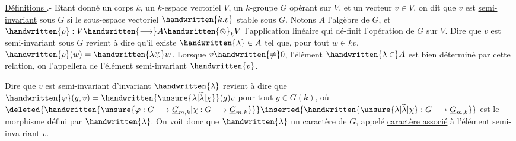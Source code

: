 \uline{Définitions }.- Etant donné un corps $k$, un $k$-espace vectoriel $V$, un $k$-groupe $G$ opérant sur $V$, et un vecteur $v\in V$, on dit que $v$ est \uline{semi-invariant} sous $G$ si le sous-espace vectoriel $\handwritten{k.v}$  stable sous $G$.
Notons $A$ l'algèbre de $G$, et $\handwritten{\rho}:V\handwritten{\longrightarrow}A\handwritten{\otimes}_k V$ l'application linéaire qui dé-\linebreak finit l'opération de $G$ sur $V$. Dire que $v$ est semi-invariant sous $G$ revient à dire  qu'il existe $\handwritten{\lambda}\in A$ tel que, pour tout $w\in kv$, $\handwritten{\rho}(w)=\handwritten{\lambda\otimes}w$. Lorsque $v\handwritten{\neq}0$, l'élément $\handwritten{\lambda\in}A$ est bien déterminé par cette relation, on l'appellera  de l'élément semi-invariant $\handwritten{v}$.

 Dire que $v$ est semi-invariant  d'invariant $\handwritten{\lambda}$ revient à dire que $\handwritten{\varphi}(g,v)=\handwritten{\unsure{\lambda|\widetilde{\lambda}|\chi}}(g)v$ pour tout $g\in G(k)$, où $\deleted{\handwritten{\unsure{\varphi:G\longrightarrow\underline{G}_{m,k}|\chi:G\longrightarrow\underline{G}_{m,k}}}}\inserted{\handwritten{\unsure{\lambda|\widetilde{\lambda}|\chi}:G\longrightarrow\underline{G}_{m,k}}}$ est le morphisme défini par $\handwritten{\lambda}$. On voit donc que $\handwritten{\lambda}$  un caractère \deleted{\handwritten{\unsure{$\chi$}}} de $G$, appelé \uline{caractère associé} à l'élément semi-inva-\linebreak riant $v$. 
\margin{\handwritten{!}}

